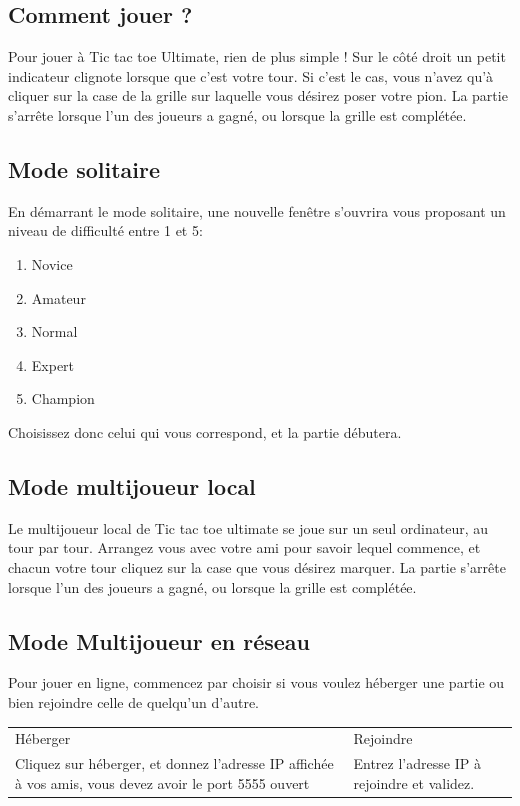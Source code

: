 \documentclass[a4paper,12pt]{article}
\newcommand{\ndpartie}[0]{La partie s'arrête lorsque l'un des joueurs a gagné, ou lorsque la grille est complétée.}
\begin{document}
\subsection{Comment jouer ?}
Pour jouer à Tic tac toe Ultimate, rien de plus simple ! Sur le côté droit un petit indicateur clignote lorsque que c'est votre tour. Si c'est le cas, vous n'avez qu'à cliquer sur la case de la grille sur laquelle vous désirez poser votre pion. 
\ndpartie 
\subsection{Mode solitaire}
En démarrant le mode solitaire, une nouvelle fenêtre s'ouvrira vous proposant un niveau de difficulté entre 1 et 5:
\begin{enumerate}
\item Novice
\item Amateur
\item Normal
\item Expert
\item Champion
\end{enumerate}
Choisissez donc celui qui vous correspond, et la partie débutera. 
\subsection{Mode multijoueur local}
Le multijoueur local de Tic tac toe ultimate se joue sur un seul ordinateur, au tour par tour. Arrangez vous avec votre ami pour savoir lequel commence, et chacun votre tour cliquez sur la case que vous désirez marquer. 
\ndpartie 
\subsection{Mode Multijoueur en réseau}
Pour jouer en ligne, commencez par choisir si vous voulez héberger une partie ou bien rejoindre celle de quelqu'un d'autre. 

\begin{center}
\begin{tabular}{p{6cm}p{6cm}}
	\rowcolor{cyan} Héberger & Rejoindre \\
	Cliquez sur héberger, et donnez l'adresse IP affichée à vos amis, vous devez avoir le port 5555 ouvert & Entrez l'adresse IP à rejoindre et validez.
\end{tabular}
\end{center}

\printindex


\end{document}
